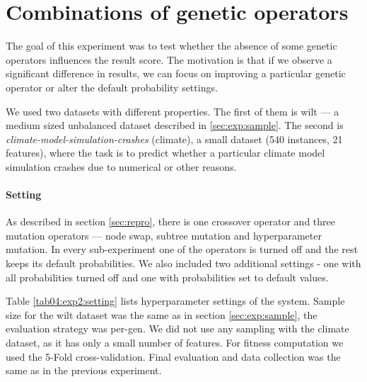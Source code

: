 





\section{Combinations of genetic operators} \label{sec:exp:genop}
The goal of this experiment was to test whether the absence of some genetic
operators influences the result score. The motivation is that if we observe a
significant difference in results, we can focus on improving a particular
genetic operator or alter the default probability settings.

We used two datasets with different properties. The first of them is wilt ---
a medium sized unbalanced dataset described in \ref{sec:exp:sample}. The second
is \emph{climate-model-simulation-crashes} (climate), a small dataset
(540 instances, 21 features), where the task is to predict whether a particular
climate model simulation crashes due to numerical or other reasons.
\citep{gmd-6-1157-2013}

\paragraph{Setting}
As described in section \ref{sec:repro}, there is one crossover operator and
three mutation operators --- node swap, subtree mutation and hyperparameter
mutation. In every sub-experiment one of the operators is turned off and the
rest keeps its default probabilities. We also included two additional
settings - one with all probabilities turned off and one with probabilities
set to default values.


Table \ref{tab04:exp2:setting} lists hyperparameter settings of the system.
Sample size for the wilt dataset was the same as in section
\ref{sec:exp:sample}, the evaluation strategy was per-gen. We did not use any
sampling with the climate dataset, as it has only a small number of features.
For fitness computation we used the 5-Fold cross-validation. Final evaluation
and data collection was the same as in the previous experiment.

